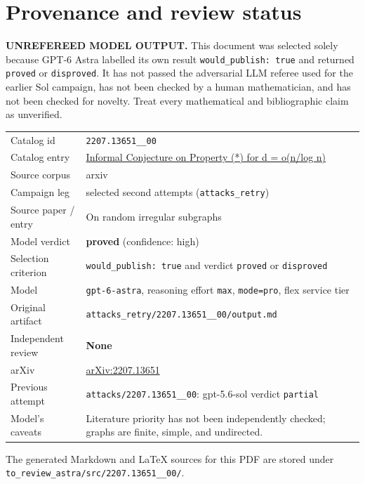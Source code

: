 \documentclass[
  11pt,
  a4paper,
]{article}
\newcounter{none} %
\begin{document}
\appendix

\section{Provenance and review
status}\label{provenance-and-review-status}

\begin{warning}

\textbf{UNREFEREED MODEL OUTPUT.} This document was selected solely
because GPT-6 Astra labelled its own result
\texttt{would\_publish:\ true} and returned \texttt{proved} or
\texttt{disproved}. It has not passed the adversarial LLM referee used
for the earlier Sol campaign, has not been checked by a human
mathematician, and has not been checked for novelty. Treat every
mathematical and bibliographic claim as unverified.

\end{warning}

{\def\LTcaptype{none} %
\begin{longtable}[]{@{}
  >{\raggedright\arraybackslash}p{}
  >{\raggedright\arraybackslash}p{}@{}}
\toprule\noalign{}
\endhead
\bottomrule\noalign{}
\endlastfoot
Catalog id & \texttt{2207.13651\_\_00} \\
Catalog entry &
\href{https://graph-theory-ai.github.io/graph-conjectures/arxiv/2207.13651__00/}{Informal
Conjecture on Property (*) for d = o(n/log n)} \\
Source corpus & arxiv \\
Campaign leg & selected second attempts (\texttt{attacks\_retry}) \\
Source paper / entry & On random irregular subgraphs \\
Model verdict & \textbf{proved} (confidence: high) \\
Selection criterion & \texttt{would\_publish:\ true} and verdict
\texttt{proved} or \texttt{disproved} \\
Model & \texttt{gpt-6-astra}, reasoning effort \texttt{max},
\texttt{mode=pro}, flex service tier \\
Original artifact &
\texttt{attacks\_retry/2207.13651\_\_00/output.md} \\
Independent review & \textbf{None} \\
arXiv & \href{https://arxiv.org/abs/2207.13651}{arXiv:2207.13651} \\
Previous attempt & \texttt{attacks/2207.13651\_\_00}: gpt-5.6-sol
verdict \texttt{partial} \\
Model's caveats & Literature priority has not been independently
checked; graphs are finite, simple, and undirected. \\
\end{longtable}
}

The generated Markdown and LaTeX sources for this PDF are stored under
\texttt{to\_review\_astra/src/2207.13651\_\_00/}.
\end{document}
